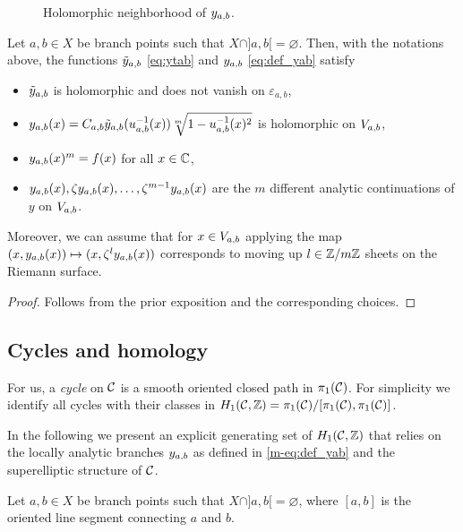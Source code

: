 \documentclass[main.tex]{subfiles}
\begin{document}
  \begin{figure}[H] \begin{center} 
  \end{center} \caption{Holomorphic neighborhood of $y_{a,b}$.}
  \label{fig:set_vab} \end{figure}

  
 \begin{prop}\label{prop:yab}
      Let $a,b\in X$ be branch points such that $X\cap]a,b[=\varnothing$.
      Then, with the notations above, the functions
      $\tilde{y}_{a,b}$ \eqref{eq:ytab} and $y_{a,b}$ \eqref{eq:def_yab}
      satisfy
     \begin{itemize}
         \item $\tilde{y}_{a,b}$ is holomorphic and does not vanish on $ε_{a,b}$,
         \item $y_{a,b}(x) = C_{a,b} \tilde{y}_{a,b}(u_{a,b}^{-1}(x)) \sqrt[m]{1-u_{a,b}^{-1}(x)^2}$ is holomorphic
         on $V_{a,b}$,
         \item $y_{a,b}(x)^m = f(x)$ for all $x\in\mathbb{C}$,
         \item $y_{a,b}(x),\zeta y_{a,b}(x),\dots,\zeta^{m-1}y_{a,b}(x)$ are the $m$ different analytic continuations of $y$ on $V_{a,b}$.
     \end{itemize}
     Moreover, we can assume that for $x \in V_{a,b}$ applying the map $(x,y_{a,b}(x)) \mapsto (x,\zeta^ly_{a,b}(x))$ corresponds to moving up $l \in \mathbb{Z}/m\mathbb{Z}$ sheets on the Riemann surface.
 \end{prop}
 \begin{proof}
  Follows from the prior exposition and the corresponding choices. 
 \end{proof}

 
 


 \subsection{Cycles and homology}\label{subsec:cycles_homo}
   
   For us, a \emph{cycle} on $\mathcal{C}$ is a smooth oriented closed path in $\pi_1(\mathcal{C})$.
   For simplicity we identify all cycles with their classes in $H_1(\mathcal{C},\mathbb{Z}) = \pi_1(\mathcal{C})/[\pi_1(\mathcal{C}),\pi_1(\mathcal{C})]$. 
   
   In the following we present an 
   explicit generating set of $H_1(\mathcal{C},\mathbb{Z})$ that relies on the locally analytic branches $y_{a,b}$ as defined in \eqref{m-eq:def_yab} and the superelliptic structure of $\mathcal{C}$.

   Let $a, b \in X$ be branch points such that $X\cap]a,b[=\varnothing$, where  $[a,b]$ is the oriented line segment connecting $a$ and $b$. 
   
\end{document}
